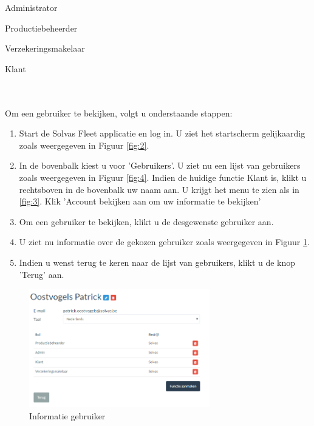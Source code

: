 \documentclass[11pt,openany]{article}
\newcommand{\cmark}{\ding{51}}%
\newcommand{\done}{\rlap{$\square$}{\raisebox{2pt}{\large\hspace{1pt}\cmark}}%
	\hspace{-2.5pt}}
\begin{document}
\label{user_show}
\begin{todolist}
	\item[\done] Administrator
	\item[\done] Productiebeheerder
	\item[\done] Verzekeringsmakelaar
	\item[\done] Klant 
\end{todolist}
\\
\\
Om een gebruiker te bekijken, volgt u onderstaande stappen:
\begin{enumerate}
	\item Start de Solvas Fleet applicatie en log in. U ziet het startscherm gelijkaardig zoals weergegeven in Figuur \ref{fig:2}.
	\item In de bovenbalk kiest u voor 'Gebruikers'. U ziet nu een lijst van gebruikers zoals weergegeven in Figuur \ref{fig:4}. Indien de huidige functie Klant is, klikt u rechtsboven in de bovenbalk uw naam aan. U krijgt het menu te zien als in \ref{fig:3}. Klik 'Account bekijken aan om uw informatie te bekijken'
	\item Om een gebruiker te bekijken, klikt u de desgewenste gebruiker aan.
	\item U ziet nu informatie over de gekozen gebruiker zoals weergegeven in Figuur \ref{fig:7}. 
	\item Indien u wenst terug te keren naar de lijst van gebruikers, klikt u de knop 'Terug' aan.
\end{enumerate}

\begin{figure}
	\centering
	\includegraphics[width=0.7\textwidth]{img/fig7.png}
	\caption{Informatie gebruiker} 
	\label{fig:7} 
\end{figure}
\newpage
\end{document}
